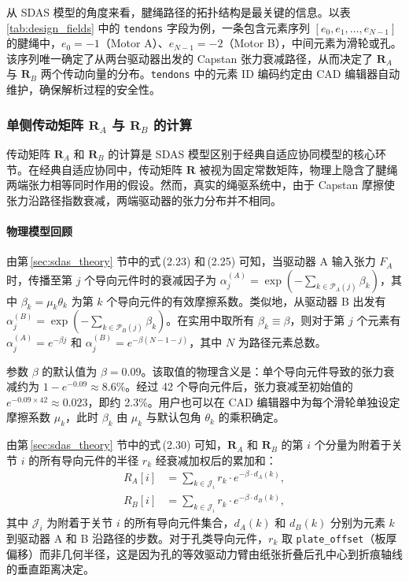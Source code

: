 从 SDAS 模型的角度来看，腱绳路径的拓扑结构是最关键的信息。以表\,\ref{tab:design_fields} 中的 \verb|tendons| 字段为例，一条包含元素序列 $[e_0, e_1, \ldots, e_{N-1}]$ 的腱绳中，$e_0 = -1$（Motor A）、$e_{N-1} = -2$（Motor B），中间元素为滑轮或孔。该序列唯一确定了从两台驱动器出发的 Capstan 张力衰减路径，从而决定了 $\mathbf{R}_A$ 与 $\mathbf{R}_B$ 两个传动向量的分布。\verb|tendons| 中的元素 ID 编码约定由 CAD 编辑器自动维护，确保解析过程的安全性。

\subsubsection{单侧传动矩阵 $\mathbf{R}_A$ 与 $\mathbf{R}_B$ 的计算}
\label{sec:RA_RB_computation}

传动矩阵 $\mathbf{R}_A$ 和 $\mathbf{R}_B$ 的计算是 SDAS 模型区别于经典自适应协同模型的核心环节。在经典自适应协同中，传动矩阵 $\mathbf{R}$ 被视为固定常数矩阵，物理上隐含了腱绳两端张力相等同时作用的假设。然而，真实的绳驱系统中，由于 Capstan 摩擦使张力沿路径指数衰减，两端驱动器的张力分布并不相同。

\paragraph{物理模型回顾}

由第\,\ref{sec:sdas_theory} 节中的式\,(2.23) 和\,(2.25) 可知，当驱动器 A 输入张力 $F_A$ 时，传播至第 $j$ 个导向元件时的衰减因子为 $\alpha_j^{(A)} = \exp(-\sum_{k \in \mathcal{P}_A(j)} \beta_k)$，其中 $\beta_k = \mu_k\theta_k$ 为第 $k$ 个导向元件的有效摩擦系数。类似地，从驱动器 B 出发有 $\alpha_j^{(B)} = \exp(-\sum_{k \in \mathcal{P}_B(j)} \beta_k)$。在实用中取所有 $\beta_k \equiv \beta$，则对于第 $j$ 个元素有 $\alpha_j^{(A)} = e^{-\beta j}$ 和 $\alpha_j^{(B)} = e^{-\beta (N-1-j)}$，其中 $N$ 为路径元素总数。

参数 $\beta$ 的默认值为 $\beta = 0.09$。该取值的物理含义是：单个导向元件导致的张力衰减约为 $1 - e^{-0.09} \approx 8.6\%$。经过 42 个导向元件后，张力衰减至初始值的 $e^{-0.09 \times 42} \approx 0.023$，即约 2.3\%。用户也可以在 CAD 编辑器中为每个滑轮单独设定摩擦系数 $\mu_k$，此时 $\beta_k$ 由 $\mu_k$ 与默认包角 $\theta_k$ 的乘积确定。

由第\,\ref{sec:sdas_theory} 节中的式\,(2.30) 可知，$\mathbf{R}_A$ 和 $\mathbf{R}_B$ 的第 $i$ 个分量为附着于关节 $i$ 的所有导向元件的半径 $r_k$ 经衰减加权后的累加和：
\begin{align}
    R_A[i] &= \sum_{k \in \mathcal{J}_i} r_k \cdot e^{-\beta \cdot d_A(k)}, \label{eq:RA_impl}\\
    R_B[i] &= \sum_{k \in \mathcal{J}_i} r_k \cdot e^{-\beta \cdot d_B(k)}, \label{eq:RB_impl}
\end{align}
其中 $\mathcal{J}_i$ 为附着于关节 $i$ 的所有导向元件集合，$d_A(k)$ 和 $d_B(k)$ 分别为元素 $k$ 到驱动器 A 和 B 沿路径的步数。对于孔类导向元件，$r_k$ 取 \texttt{plate\_offset}（板厚偏移）而非几何半径，这是因为孔的等效驱动力臂由纸张折叠后孔中心到折痕轴线的垂直距离决定。

